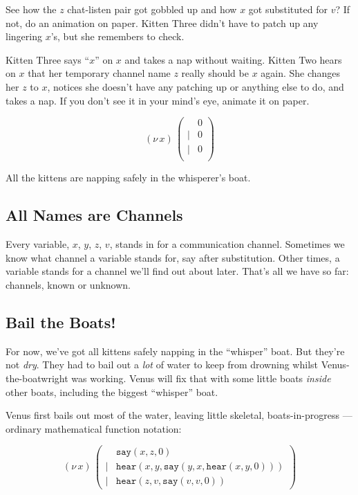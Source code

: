 \documentclass[10pt,oneside,x11names]{article}
\newcommand\napping    [0]{0}
\newcommand\whispering [2]{(\nu\,#1)\,{#2}}
\theoremstyle{definition}
\theoremstyle{warning}
\begin{document}
See how the \(z\) chat-listen pair got gobbled up and how \(x\) got
substituted for \(v\)? If not, do an animation on paper. Kitten
Three didn't have to patch up any lingering \(x\)'s, but she
remembers to check.

Kitten Three says ``\(x\)'' on \(x\) and takes a nap without waiting.
Kitten Two hears on \(x\) that her temporary channel name \(z\) really
should be \(x\) again. She changes her \(z\) to \(x\), notices she
doesn't have any patching up or anything else to do, and takes a
nap. If you don't see it in your mind's eye, animate it on paper.

\begin{equation}
\whispering{x}{\left(
\begin{array}{clll}
 {}     & \napping   \\
 \vert  & {\napping} \\
 \vert  & {\napping} \\
\end{array}\right)}
\end{equation}

All the kittens are napping safely in the whisperer's boat.

\subsection{All Names are Channels}
\label{sec:org4f686d5}

Every variable, \(x\), \(y\), \(z\), \(v\), stands in for a communication
channel. Sometimes we know what channel a variable stands for, say
after substitution. Other times, a variable stands for a channel
we'll find out about later. That's all we have so far: channels,
known or unknown.

\subsection{Bail the Boats!}
\label{sec:orga0356b5}

For now, we've got all kittens safely napping in the ``whisper''
boat. But they're not \emph{dry}. They had to bail out a \emph{lot} of water
to keep from drowning whilst Venus-the-boatwright was working.
Venus will fix that with some little boats \emph{inside} other boats,
including the biggest ``whisper'' boat.

Venus first bails out most of the water, leaving little skeletal,
boats-in-progress --- ordinary mathematical function notation:

\begin{equation}
\whispering{x}{\left(
\begin{array}{clll}
 {}     & \texttt{say} (x, z, \napping) \\
 \vert  & \texttt{hear}(x, y, \texttt{say}(y, x, \texttt{hear}(x, y, \napping))) \\
 \vert  & \texttt{hear}(z, v, \texttt{say}(v, v, \napping))
\end{array}\right)}
\end{equation}
\end{document}
